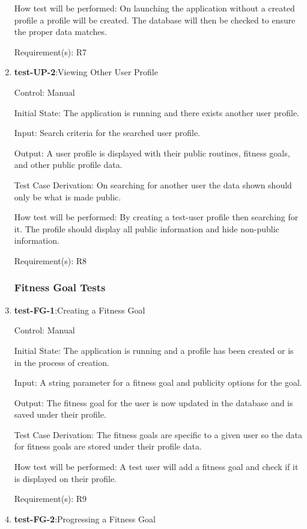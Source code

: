 \documentclass[12pt, titlepage]{article}
\begin{document}
\begin{enumerate}
		How test will be performed: On launching the application without a created profile a profile will be created. The database will then be checked to ensure the proper data matches.
		
		Requirement(s): R7
		
		\item{\textbf{test-UP-2}}:Viewing Other User Profile
		
		Control: Manual
		
		Initial State: The application is running and there exists another user profile.
		
		Input: Search criteria for the searched user profile.
		
		Output: A user profile is displayed with their public routines, fitness goals, and other public profile data.
		
		Test Case Derivation: On searching for another user the data shown should only be what is made public.
		
		How test will be performed: By creating a test-user profile then searching for it. The profile should display all public information and hide non-public information. 
		
		Requirement(s): R8
		
		\subsubsection{Fitness Goal Tests}
		
		\item{\textbf{test-FG-1}}:Creating a Fitness Goal
		
		Control: Manual
		
		Initial State: The application is running and a profile has been created or is in the process of creation.
		
		Input: A string parameter for a fitness goal and publicity options for the goal.
		
		Output: The fitness goal for the user is now updated in the database and is saved under their profile.
		
		Test Case Derivation: The fitness goals are specific to a given user so the data for fitness goals are stored under their profile data.
		
		How test will be performed: A test user will add a fitness goal and check if it is displayed on their profile.
		
		Requirement(s): R9
		
		\item{\textbf{test-FG-2}}:Progressing a Fitness Goal
		

\end{enumerate}
\end{document}
